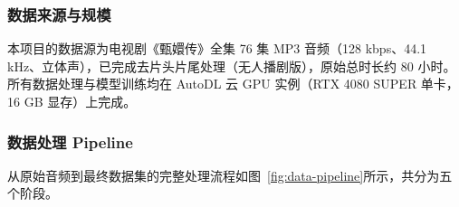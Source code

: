 \documentclass[12pt,a4paper]{article}
\begin{document}
\subsubsection{数据来源与规模}

本项目的数据源为电视剧《甄嬛传》全集 76 集 MP3 音频（128 kbps、44.1 kHz、立体声），已完成去片头片尾处理（无人播剧版），原始总时长约 80 小时。所有数据处理与模型训练均在 AutoDL 云 GPU 实例（RTX 4080 SUPER 单卡，16 GB 显存）上完成。

\subsubsection{数据处理 Pipeline}

从原始音频到最终数据集的完整处理流程如图~\ref{fig:data-pipeline}所示，共分为五个阶段。
\end{document}
